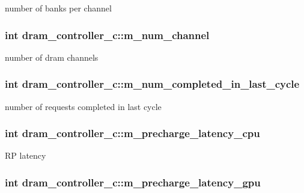 \label{classdram__controller__c_ac3907c9a15aa3131c9aee34313a28e37}
number of banks per channel \hypertarget{classdram__controller__c_a9a20ac3f7fa0c171702fc265f0ccc9bc}{
\subsubsection[{m\_\-num\_\-channel}]{\setlength{\rightskip}{0pt plus 5cm}int {\bf dram\_\-controller\_\-c::m\_\-num\_\-channel}}}
\label{classdram__controller__c_a9a20ac3f7fa0c171702fc265f0ccc9bc}
number of dram channels \hypertarget{classdram__controller__c_aaf23b00bc5d6622200397b680a4a7e76}{
\subsubsection[{m\_\-num\_\-completed\_\-in\_\-last\_\-cycle}]{\setlength{\rightskip}{0pt plus 5cm}int {\bf dram\_\-controller\_\-c::m\_\-num\_\-completed\_\-in\_\-last\_\-cycle}}}
\label{classdram__controller__c_aaf23b00bc5d6622200397b680a4a7e76}
number of requests completed in last cycle \hypertarget{classdram__controller__c_aef712e15ee703272a9381b82cd487bcb}{
\subsubsection[{m\_\-precharge\_\-latency\_\-cpu}]{\setlength{\rightskip}{0pt plus 5cm}int {\bf dram\_\-controller\_\-c::m\_\-precharge\_\-latency\_\-cpu}}}
\label{classdram__controller__c_aef712e15ee703272a9381b82cd487bcb}
RP latency \hypertarget{classdram__controller__c_aa61d120e34408419e0962dafb2681402}{
\subsubsection[{m\_\-precharge\_\-latency\_\-gpu}]{\setlength{\rightskip}{0pt plus 5cm}int {\bf dram\_\-controller\_\-c::m\_\-precharge\_\-latency\_\-gpu}}}
